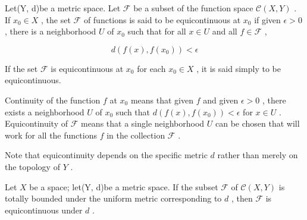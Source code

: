 \begin{definition} Let(Y, d)be a metric space. Let \(\mathcal{F}\) be a subset of the function space \(\mathcal{C}\left( {X,Y}\right)\) . If \({x}_{0} \in  X\) , the set \(\mathcal{F}\) of functions is said to be equicontinuous at \({x}_{0}\) if given \(\epsilon  > 0\) , there is a neighborhood \(U\) of \({x}_{0}\) such that for all \(x \in  U\) and all \(f \in  \mathcal{F}\) ,

\[
d\left( {f\left( x\right) ,f\left( {x}_{0}\right) }\right)  < \epsilon
\]

If the set \(\mathcal{F}\) is equicontinuous at \({x}_{0}\) for each \({x}_{0} \in  X\) , it is said simply to be equicontinuous.
\end{definition}

Continuity of the function \(f\) at \({x}_{0}\) means that given \(f\) and given \(\epsilon  > 0\) , there exists a neighborhood \(U\) of \({x}_{0}\) such that \(d\left( {f\left( x\right) ,f\left( {x}_{0}\right) }\right)  < \epsilon\) for \(x \in  U\) . Equicontinuity of \(\mathcal{F}\) means that a single neighborhood \(U\) can be chosen that will work for all the functions \(f\) in the collection \(\mathcal{F}\) .

Note that equicontinuity depends on the specific metric \(d\) rather than merely on the topology of \(Y\) .

\begin{lemma} Let \(X\) be a space; let(Y, d)be a metric space. If the subset \(\mathcal{F}\) of \(\mathcal{C}\left( {X,Y}\right)\) is totally bounded under the uniform metric corresponding to \(d\) , then \(\mathcal{F}\) is equicontinuous under \(d\) .
\end{lemma}

